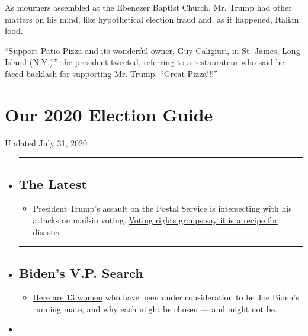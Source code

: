 As mourners assembled at the Ebenezer Baptist Church, Mr. Trump had
other matters on his mind, like hypothetical election fraud and, as it
happened, Italian food.

``Support Patio Pizza and its wonderful owner, Guy Caligiuri, in St.
James, Long Island (N.Y.).'' the president tweeted, referring to a
restaurateur who said he faced backlash for supporting Mr. Trump.
``Great Pizza!!!''

\hypertarget{our-2020-election-guide}{%
\section{Our 2020 Election Guide}\label{our-2020-election-guide}}

Updated July 31, 2020

\begin{itemize}
\item
  \begin{center}\rule{0.5\linewidth}{\linethickness}\end{center}

  \hypertarget{the-latest}{%
  \subsection{The Latest}\label{the-latest}}

  \begin{itemize}
  \tightlist
  \item
    President Trump's assault on the Postal Service is intersecting with
    his attacks on mail-in voting.
    \href{https://www.nytimes.com/2020/07/31/us/politics/trump-usps-mail-delays.html?action=click\&pgtype=Article\&state=default\&region=BELOW_MAIN_CONTENT\&context=storylines_guide}{Voting
    rights groups say it is a recipe for disaster.}
  \end{itemize}
\item
  \begin{center}\rule{0.5\linewidth}{\linethickness}\end{center}

  \hypertarget{bidens-vp-search}{%
  \subsection{Biden's V.P. Search}\label{bidens-vp-search}}

  \begin{itemize}
  \tightlist
  \item
    \href{https://www.nytimes.com/article/biden-vice-president-2020.html?action=click\&pgtype=Article\&state=default\&region=BELOW_MAIN_CONTENT\&context=storylines_guide}{Here
    are 13 women} who have been under consideration to be Joe Biden's
    running mate, and why each might be chosen --- and might not be.
  \end{itemize}
\item
  \begin{center}\rule{0.5\linewidth}{\linethickness}\end{center}


\end{itemize}
